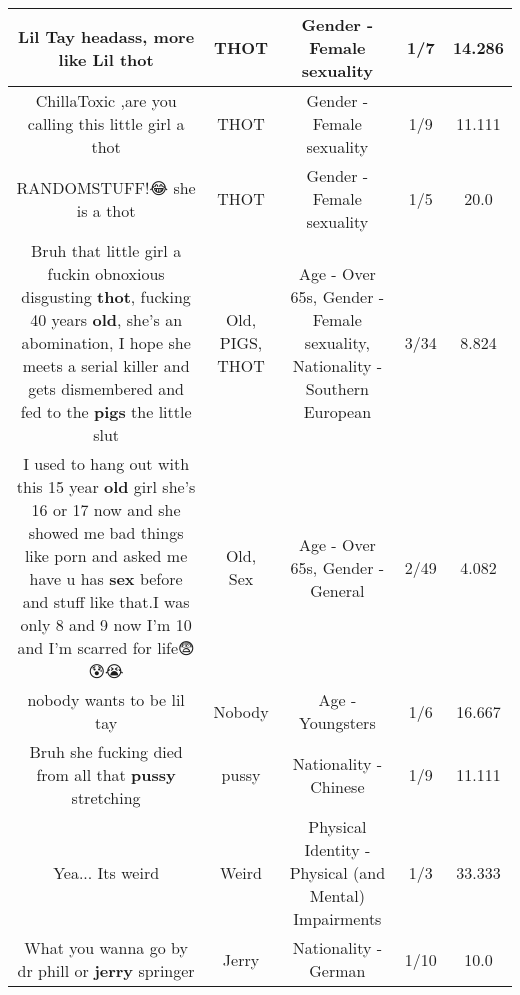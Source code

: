 \documentclass[11pt]{article}
\newlength\mylength
\begin{document}
\begin{center}
\begin{longtable}{|C{.65\mylength}|C{.30\mylength}|C{.12\mylength}|C{.12\mylength}|C{.12\mylength}|}
  \small Lil Tay headass, more like Lil thot\normalsize   & THOT & Gender - Female sexuality & 1/7 & 14.286 \\  \hline
  \small ChillaToxic ,are you calling this little girl a thot\normalsize   & THOT & Gender - Female sexuality & 1/9 & 11.111 \\  \hline
  \small RANDOMSTUFF!😂 she is a thot\normalsize   & THOT & Gender - Female sexuality & 1/5 & 20.0 \\  \hline
  \small Bruh that little girl a fuckin obnoxious disgusting \textbf{thot}, fucking 40 years \textbf{old}, she's an abomination, I hope she meets a serial killer and gets dismembered and fed to the \textbf{pigs} the little slut\normalsize   & Old, PIGS, THOT & Age - Over 65s, Gender - Female sexuality, Nationality - Southern European & 3/34 & 8.824 \\  \hline
  \small I used to hang out with this 15 year \textbf{old} girl she's 16 or 17 now and she showed me bad things like porn and asked me have u has \textbf{sex} before and stuff like that.I was only 8 and 9 now I'm 10 and I'm scarred for life😨😰😭\normalsize   & Old, Sex & Age - Over 65s, Gender - General & 2/49 & 4.082 \\  \hline
  \small nobody wants to be lil tay\normalsize   & Nobody & Age - Youngsters & 1/6 & 16.667 \\  \hline
  \small Bruh she fucking died from all that \textbf{pussy} stretching\normalsize   & pussy & Nationality - Chinese & 1/9 & 11.111 \\  \hline
  \small Yea... Its weird\normalsize   & Weird & Physical Identity - Physical (and Mental) Impairments & 1/3 & 33.333 \\  \hline
  \small What you wanna go by dr phill or \textbf{jerry} springer\normalsize   & Jerry & Nationality - German & 1/10 & 10.0 \\  \hline

\end{longtable}
\end{center}
\end{document}
